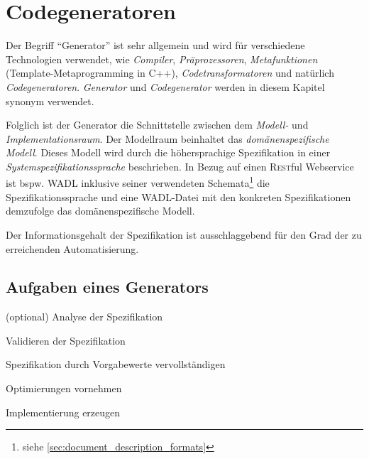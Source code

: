 \section{Codegeneratoren}


Der Begriff \enquote{Generator} ist sehr allgemein und wird für verschiedene Technologien verwendet, wie \emph{Compiler}, \emph{Präprozessoren}, \emph{Metafunktionen} (Template-Metaprogramming in C++), \emph{Codetransformatoren} und natürlich \emph{Codegeneratoren}. 
\emph{Generator} und \emph{Codegenerator} werden in diesem Kapitel synonym verwendet.


Folglich ist der Generator die Schnittstelle zwischen dem \emph{Modell-} und \emph{Implementationsraum}. Der Modellraum beinhaltet das \emph{domänenspezifische Modell}. Dieses Modell wird durch die höhersprachige Spezifikation in einer \emph{Systemspezifikationssprache} beschrieben. In Bezug auf einen \textsc{Rest}ful Webservice ist bspw. \gls{WADL} inklusive seiner verwendeten Schemata\footnote{siehe \cref{sec:document_description_formats}} die Spezifikationssprache und eine \gls{WADL}-Datei mit den konkreten Spezifikationen demzufolge das domänenspezifische Modell.

Der Informationsgehalt der Spezifikation ist ausschlaggebend für den Grad der zu erreichenden Automatisierung.

\subsection{Aufgaben eines Generators}
\label{sec:generator_tasks}

\begin{compactenum}
    \item[(optional)] Analyse der Spezifikation
    \item Validieren der Spezifikation
    \item Spezifikation durch Vorgabewerte vervollständigen
    \item Optimierungen vornehmen
    \item Implementierung erzeugen
\end{compactenum}

